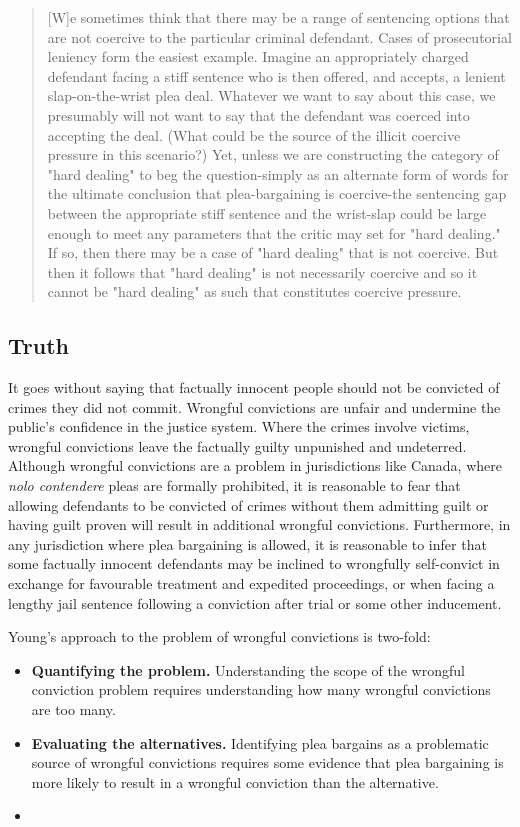 \begin{quote}
    [W]e sometimes think that there may be a range of sentencing options that are not coercive to the particular criminal defendant. Cases of prosecutorial leniency form the easiest example. Imagine an appropriately charged defendant facing a stiff sentence who is then offered, and accepts, a lenient slap-on-the-wrist plea deal. Whatever we want to say about this case, we presumably will not want to say that the defendant was coerced into accepting the deal. (What could be the source of the illicit coercive pressure in this scenario?) Yet, unless we are constructing the category of "hard dealing" to beg the question-simply as an alternate form of words for the ultimate conclusion that plea-bargaining is coercive-the sentencing gap between the appropriate stiff sentence and the wrist-slap could be large enough to meet any parameters that the critic may set for "hard dealing." If so, then there may be a case of "hard dealing" that is not coercive. But then it follows that "hard dealing" is not necessarily coercive and so it cannot be "hard dealing" as such that constitutes coercive pressure.
\end{quote}

\subsection{Truth}

It goes without saying that factually innocent people should not be convicted of crimes they did not commit. Wrongful convictions are unfair and undermine the public's confidence in the justice system. Where the crimes involve victims, wrongful convictions leave the factually guilty unpunished and undeterred. Although wrongful convictions are a problem in jurisdictions like Canada, where \textit{nolo contendere} pleas are formally prohibited, it is reasonable to fear that allowing defendants to be convicted of crimes without them admitting guilt or having guilt proven will result in additional wrongful convictions. Furthermore, in any jurisdiction where plea bargaining is allowed, it is reasonable to infer that some factually innocent defendants may be inclined to wrongfully self-convict in exchange for favourable treatment and expedited proceedings, or when facing a lengthy jail sentence following a conviction after trial or some other inducement. 

Young's approach to the problem of wrongful convictions is two-fold:

\begin{itemize}
    \item \textbf{Quantifying the problem.} Understanding the scope of the wrongful conviction problem requires understanding how many wrongful convictions are too many.
    \item \textbf{Evaluating the alternatives.} Identifying plea bargains as a problematic source of wrongful convictions requires some evidence that plea bargaining is more likely to result in a wrongful conviction than the alternative.
    \item 
\end{itemize}

